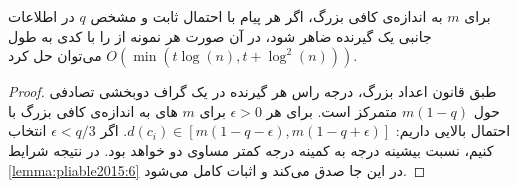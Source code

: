 \begin{theorem}
	\cite{pliable2015paper}
	\label{thm:pliable2015_8}
	برای
	$m$
	به اندازه‌ی کافی بزرگ، اگر هر پیام با احتمال ثابت و مشخص 
	$q$
	در اطلاعات جانبی یک گیرنده ضاهر شود، در آن صورت هر نمونه از
	را با کدی به طول
	$O(\min(t \log(n), t + \log^2(n)))$
	می‌توان حل کرد.
\end{theorem}
\begin{proof}
	طبق قانون اعداد بزرگ، درجه راس هر گیرنده در یک گراف دوبخشی تصادفی حول
	$m (1 - q)$
	متمرکز است. برای هر
	$\epsilon > 0$
	برای 
	$m$	های
	به اندازه‌ی کافی بزرگ با احتمال بالایی داریم:
	$d(c_i) \in [m(1 - q - \epsilon), m(1 - q + \epsilon)]$.
	اگر
	$\epsilon < q/3$
	انتخاب کنیم، نسبت بیشینه درجه به کمینه درجه کمتر مساوی دو خواهد بود. در نتیجه شرایط
	\autoref{lemma:pliable2015:6}
	در این جا صدق می‌کند و اثبات کامل می‌شود.
\end{proof}
